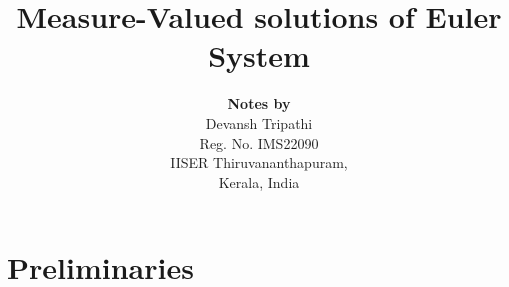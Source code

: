 \documentclass[12pt]{report}
\title{Measure-Valued solutions of Euler System}
\author{
    {\textbf{Notes by}}\\Devansh Tripathi\\{Reg. No. IMS22090}\\{IISER Thiruvananthapuram,}\\{Kerala, India}\\[1 cm]
}
\theoremstyle{plain}
\theoremstyle{definition}
\begin{document}
\maketitle

\tableofcontents

\chapter{Preliminaries}

\end{document}
